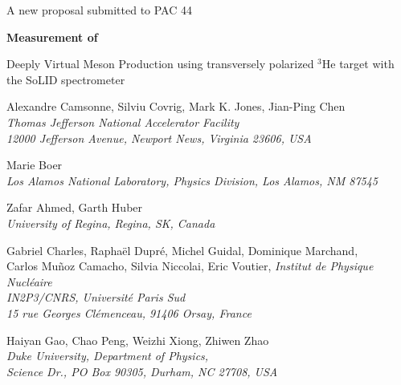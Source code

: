 \documentclass{article}
\begin{document}

\begin{center}

{\Huge A new proposal submitted to PAC 44}

\vspace*{25pt}

{\LARGE\bf Measurement of

\vspace*{7pt}

 Deeply Virtual Meson Production using transversely polarized $\mathrm{^{3}He}$ target with the SoLID spectrometer}

\vspace*{30pt}

Alexandre Camsonne, Silviu Covrig, Mark K. Jones, Jian-Ping Chen\\
\vspace*{5pt}
{\it Thomas Jefferson National Accelerator Facility \\
12000 Jefferson Avenue, Newport News, Virginia 23606, USA}

\vspace*{15pt}

Marie Boer\\
\vspace*{5pt}
{\it Los Alamos National Laboratory, Physics Division, Los Alamos, NM 87545}
\vspace*{15pt}

Zafar Ahmed, Garth Huber \\
\vspace*{5pt}
{\it University of Regina, Regina, SK, Canada}

\vspace*{15pt}

 Gabriel Charles, Rapha\"el Dupr\'e, Michel Guidal, Dominique Marchand, \\
Carlos Mu\~noz Camacho, Silvia Niccolai, Eric Voutier,
\vspace*{5pt}
{\it Institut de Physique Nucl\'eaire \\ IN2P3/CNRS, Universit\'e Paris Sud \\
15 rue Georges Cl\'emenceau, 91406 Orsay, France}

\vspace*{15pt}

Haiyan Gao, Chao Peng, Weizhi Xiong, Zhiwen Zhao\\
\vspace*{5pt}
{\it Duke University, Department of Physics, \\ Science Dr., PO Box 90305, Durham, NC 27708, USA}


\end{center}
\end{document}
